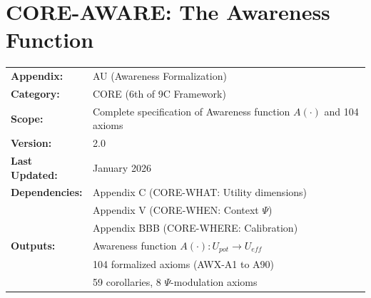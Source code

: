 %

\chapter{CORE-AWARE: The Awareness Function}
\label{app:core-aware}
\label{app:bcm-axiom-formalization}  %


\begin{tcolorbox}[colback=blue!5!white, colframe=blue!75!black,
    title=\textbf{Appendix AU: CORE-AWARE}]

\begin{tabular}{@{}ll@{}}
\textbf{Appendix:} & AU (Awareness Formalization) \\
\textbf{Category:} & CORE (6th of 9C Framework) \\
\textbf{Scope:} & Complete specification of Awareness function $A(\cdot)$ and 104 axioms \\
\textbf{Version:} & 2.0 \\
\textbf{Last Updated:} & January 2026 \\
\textbf{Dependencies:} & Appendix C (CORE-WHAT: Utility dimensions) \\
                       & Appendix V (CORE-WHEN: Context $\Psi$) \\
                       & Appendix BBB (CORE-WHERE: Calibration) \\
\textbf{Outputs:} & Awareness function $A(\cdot): U_{pot} \to U_{eff}$ \\
                  & 104 formalized axioms (AWX-A1 to A90) \\
                  & 59 corollaries, 8 $\Psi$-modulation axioms \\
\end{tabular}

\end{tcolorbox}

